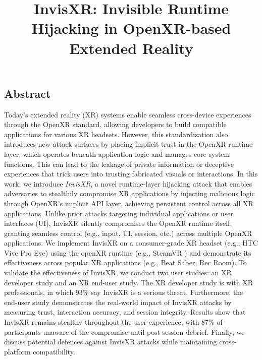 \documentclass[letterpaper,twocolumn,10pt]{article}
\begin{document}
\date{}

\title{\Large \bf InvisXR: Invisible Runtime Hijacking in OpenXR-based Extended Reality }

\maketitle

\thispagestyle{empty}


\subsection*{Abstract}
Today’s extended reality (XR) systems enable seamless cross-device experiences through the OpenXR standard, allowing developers to build compatible applications for various XR headsets. However, this standardization also introduces new attack surfaces by placing implicit trust in the OpenXR runtime layer, which operates beneath application logic and manages core system functions. This can lead to the leakage of private information or deceptive experiences that trick users into trusting fabricated visuals or interactions. In this work, we introduce \textit{InvisXR}, a novel runtime-layer hijacking attack that enables adversaries to stealthily compromise XR applications by injecting malicious logic through OpenXR's implicit API layer, achieving persistent control across all XR applications. Unlike prior attacks targeting individual applications or user interfaces (UI), InvisXR silently compromises the OpenXR runtime itself, granting seamless control (e.g., input, UI, session, etc.) across multiple OpenXR applications. We implement InvisXR on a consumer-grade XR headset (e.g., HTC Vive Pro Eye) using the openXR runtime (e.g., SteamVR ) and demonstrate its effectiveness across popular XR applications (e.g., Beat Saber, Rec Room). To validate the effectiveness of InvisXR, we conduct two user studies: an XR developer study and an XR end-user study. The XR developer study is with XR professionals, in which 93\% say InvisXR is a serious threat. Furthermore, the end-user study demonstrates the real-world impact of InvisXR attacks by measuring trust, interaction accuracy, and session integrity. Results show that InvisXR remains stealthy throughout the user experience, with 87\% of participants unaware of the compromise until post-session debrief. Finally, we discuss potential defences against InvisXR attacks while maintaining cross-platform compatibility.
\end{document}
